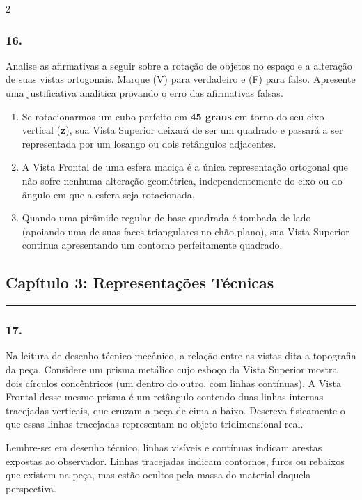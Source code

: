 \documentclass[twoside, 10pt, a4paper]{article}
\newlength{\espacoPosTitulo}\setlength{\espacoPosTitulo}{0.3cm}
\newlength{\espacoQuestao}\setlength{\espacoQuestao}{0.2cm}
\newlength{\espacoAlt}\setlength{\espacoAlt}{0.2cm}
\begin{document}
\begin{multicols*}{2}
\subsubsection*{16.} Analise as afirmativas a seguir sobre a rotação de objetos no espaço e a alteração de suas vistas ortogonais. Marque (V) para verdadeiro e (F) para falso. Apresente uma justificativa analítica provando o erro das afirmativas falsas.
\begin{enumerate}[label=\Roman*., itemsep=\espacoAlt]
\item Se rotacionarmos um cubo perfeito em \textbf{45 graus} em torno do seu eixo vertical (\textbf{z}), sua Vista Superior deixará de ser um quadrado e passará a ser representada por um losango ou dois retângulos adjacentes.
\item A Vista Frontal de uma esfera maciça é a única representação ortogonal que não sofre nenhuma alteração geométrica, independentemente do eixo ou do ângulo em que a esfera seja rotacionada.
\item Quando uma pirâmide regular de base quadrada é tombada de lado (apoiando uma de suas faces triangulares no chão plano), sua Vista Superior continua apresentando um contorno perfeitamente quadrado.
\end{enumerate}
\par\vspace{\espacoQuestao}

\subsection*{Capítulo 3: Representações Técnicas}
\vspace{-0.2cm}\noindent\rule{\linewidth}{1.5pt} 
\par\vspace{\espacoPosTitulo}
\subsubsection*{17.} Na leitura de desenho técnico mecânico, a relação entre as vistas dita a topografia da peça. Considere um prisma metálico cujo esboço da Vista Superior mostra dois círculos concêntricos (um dentro do outro, com linhas contínuas). A Vista Frontal desse mesmo prisma é um retângulo contendo duas linhas internas tracejadas verticais, que cruzam a peça de cima a baixo. Descreva fisicamente o que essas linhas tracejadas representam no objeto tridimensional real.
\begin{boxdica}
Lembre-se: em desenho técnico, linhas visíveis e contínuas indicam arestas expostas ao observador. Linhas tracejadas indicam contornos, furos ou rebaixos que existem na peça, mas estão ocultos pela massa do material daquela perspectiva.
\end{boxdica}
\par\vspace{\espacoQuestao}


\end{multicols*}
\end{document}
